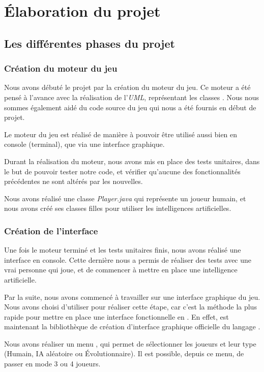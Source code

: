 \section{Élaboration du projet}

\subsection{Les différentes phases du projet}
	\subsubsection{Création du moteur du jeu}
		
		Nous avons débuté le projet par la création du moteur du jeu.
		Ce moteur a été pensé à l'avance avec la réalisation de l'\emph{UML},
		représentant les classes \java.
		Nous nous sommes également aidé du code source du jeu qui nous a été fournis
		en début de projet.
		
		Le moteur du jeu est réalisé de manière à pouvoir être utilisé aussi bien en
		console (terminal), que via une interface graphique.
		
		Durant la réalisation du moteur, nous avons mis en place des tests unitaires,
		dans le but de pouvoir tester notre code, et vérifier qu'aucune des
		fonctionnalités précédentes ne sont altérés par les nouvelles.
		
		Nous avons réalisé une classe \emph{Player.java} qui représente un joueur humain,
		et nous avons créé ses classes filles pour utiliser les intelligences artificielles.
		
	\subsubsection{Création de l'interface}
	
		Une fois le moteur terminé et les tests unitaires finis, nous avons réalisé une interface en console.
		Cette dernière nous a permis de réaliser des tests avec une vrai personne qui joue, et de 
		commencer à mettre en place une intelligence artificielle.
		
		Par la suite, nous avons commencé à travailler sur une interface graphique
		du jeu. Nous avons choisi d'utiliser \fx pour réaliser cette étape, car c'est
		la méthode la plus rapide pour mettre en place une interface fonctionnelle en \java.
		En effet, \fx est maintenant la bibliothèque de création d'interface graphique officielle du langage \java.
		
		Nous avons réaliser un menu , qui permet de sélectionner les joueurs et leur type (Humain, IA aléatoire ou Évolutionnaire). Il est possible, depuis ce menu, de passer en mode 3 ou 4 joueurs.
		

